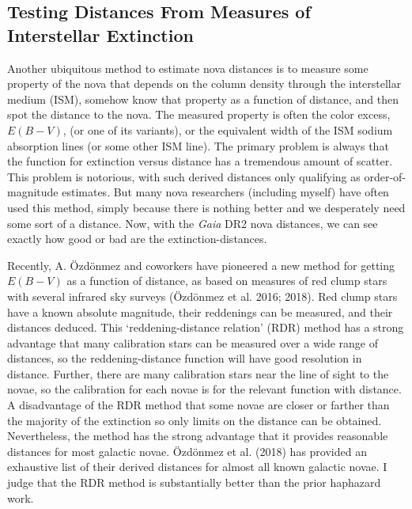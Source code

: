 \documentclass[a4paper,fleqn,usenatbib]{mnras}
\begin{document}
\subsection{Testing Distances From Measures of Interstellar Extinction}

Another ubiquitous method to estimate nova distances is to measure some property of the nova that depends on the column density through the interstellar medium (ISM), somehow know that property as a function of distance, and then spot the distance to the nova.  The measured property is often the color excess, $E(B-V)$, (or one of its variants), or the equivalent width of the ISM sodium absorption lines (or some other ISM line).  The primary problem is always that the function for extinction versus distance has a tremendous amount of scatter.  This problem is notorious, with such derived distances only qualifying as order-of-magnitude estimates.  But many nova researchers (including myself) have often used this method, simply because there is nothing better and we desperately need some sort of a distance.  Now, with the {\it Gaia} DR2 nova distances, we can see exactly how good or bad are the extinction-distances.

Recently, A. \"{O}zd\"{o}nmez and coworkers have pioneered a new method for getting $E(B-V)$ as a function of distance, as based on measures of red clump stars with several infrared sky surveys (\"{O}zd\"{o}nmez et al. 2016; 2018).  Red clump stars have a known absolute magnitude, their reddenings can be measured, and their distances deduced.  This `reddening-distance relation' (RDR) method has a strong advantage that many calibration stars can be measured over a wide range of distances, so the reddening-distance function will have good resolution in distance.  Further, there are many calibration stars near the line of sight to the novae, so the calibration for each novae is for the relevant function with distance.  A disadvantage of the RDR method that some novae are closer or farther than the majority of the extinction so only limits on the distance can be obtained.  Nevertheless, the method has the strong advantage that it provides reasonable distances for most galactic novae.  \"{O}zd\"{o}nmez et al. (2018) has provided an exhaustive list of their derived distances for almost all known galactic novae.  I judge that the RDR method is substantially better than the prior haphazard work.
\end{document}
